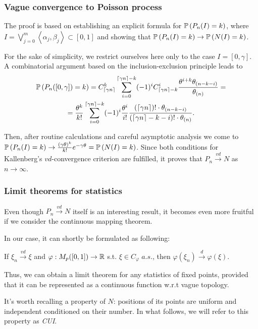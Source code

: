 \documentclass[12pt,pdf,aspectratio=169,t]{beamer}
\begin{document}
    \begin{frame}
        \frametitle{Vague convergence to Poisson process}
        The proof is based on establishing an explicit formula
        for $\P{P_n(I) = k}$, where $I = \bigvee_{j=0}^m \left<\alpha_j, \beta_j\right> \subset [0, 1]$ and
        showing that $\P{P_n(I) = k} \to \P{N(I) = k}$.

        For the sake of simplicity, we restrict ourselves here only to the case
        $I = [0, \gamma]$.
        A combinatorial argument based on the inclusion-exclusion principle leads to
        \vspace{-1em}
        \begin{gather*}
            \P{P_n([0, \gamma]) = k} = C_{\ceil*{\gamma n}}^k \sum_{i=0}^{\ceil*{\gamma n}-k} (-1)^i C_{\ceil*{\gamma n}-k}^i
            \frac{\theta^{i+k} \theta_{(n-k-i)}}{\theta_{(n)}} = \\ =
            \frac{\theta^k}{k!} \sum_{i=0}^{\ceil*{\gamma n}-k} (-1)^i \frac{\theta^i}{i!} 
            \frac{(\ceil*{\gamma n})! \cdot \theta_{(n-k-i)}}{(\ceil*{\gamma n} - k - i)! \cdot \theta_{(n)}}.
        \end{gather*}

        Then, after routine calculations and careful asymptotic analysis
        we come to $\P{P_n(I) = k} \to \frac{(\gamma \theta)^k}{k!} e^{-\gamma \theta} = \P{N(I) = k}$.
        Since both conditions for Kallenberg's $vd$-convergence criterion are fulfilled,
        it proves that $P_n \overset{vd}{\longrightarrow} N$ as $n \to \infty$.     
    \end{frame}
    \begin{frame}
        \frametitle{Limit theorems for statistics}
        Even though $P_n \overset{vd}{\longrightarrow} N$ itself
        is an interesting result, it becomes even more fruitful 
        if we consider the continuous mapping theorem.

        In our case, it can shortly be formulated as following:
        \begin{theorem}
            If $\xi_n \overset{vd}{\longrightarrow} \xi$ and
            $\varphi : M_p([0, 1]) \to \R$ s.t.
            $\xi \in C_{\varphi} \; a.s.$, then
            $\varphi(\xi_n) \overset{d}{\longrightarrow} \varphi(\xi)$.
        \end{theorem}
        Thus, we can obtain a limit theorem for any statistics of fixed points,
        provided that it can be represented as a continuous function w.r.t vague topology.

        It's worth recalling a property of $N$:
        positions of its points are uniform and independent conditioned on their number.
        In what follows, we will refer to this property as \emph{CUI}.
    \end{frame}
\end{document}
